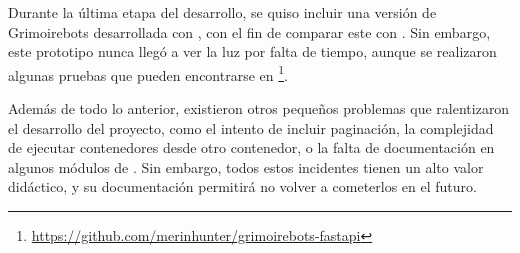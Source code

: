Durante la última etapa del desarrollo, se quiso incluir una versión de Grimoirebots desarrollada con , con el fin de comparar este con . Sin embargo, este prototipo nunca llegó a ver la luz por falta de tiempo, aunque se realizaron algunas pruebas que pueden encontrarse en \footnote{\url{https://github.com/merinhunter/grimoirebots-fastapi}}.

Además de todo lo anterior, existieron otros pequeños problemas que ralentizaron el desarrollo del proyecto, como el intento de incluir paginación, la complejidad de ejecutar contenedores desde otro contenedor, o la falta de documentación en algunos módulos de . Sin embargo, todos estos incidentes tienen un alto valor didáctico, y su documentación permitirá no volver a cometerlos en el futuro.
